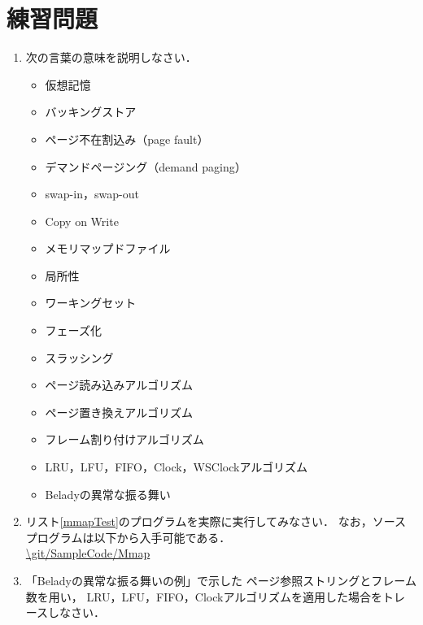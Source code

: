 \newpage
\section*{練習問題}
\begin{enumerate}
  \renewcommand{\labelenumi}{\ttfamily\arabic{chapter}.\arabic{enumi}}
  \setlength{\leftskip}{1em}
\item 次の言葉の意味を説明しなさい．
  \begin{itemize}
  \item 仮想記憶
  \item バッキングストア
  \item ページ不在割込み（page fault）
  \item デマンドページング（demand paging）
  \item swap-in，swap-out
  \item Copy on Write
  \item メモリマップドファイル
  \item 局所性
  \item ワーキングセット
  \item フェーズ化
  \item スラッシング
  \item ページ読み込みアルゴリズム
  \item ページ置き換えアルゴリズム
  \item フレーム割り付けアルゴリズム
  \item LRU，LFU，FIFO，Clock，WSClockアルゴリズム
  \item Beladyの異常な振る舞い
  \end{itemize}
\item リスト\ref{mmapTest}のプログラムを実際に実行してみなさい．
  なお，ソースプログラムは以下から入手可能である． \\
  \url{\git/SampleCode/Mmap}
\item 「Beladyの異常な振る舞いの例」で示した
  ページ参照ストリングとフレーム数を用い，
  LRU，LFU，FIFO，Clockアルゴリズムを適用した場合をトレースしなさい．
\end{enumerate}
